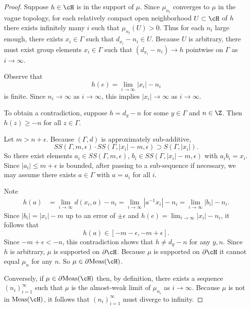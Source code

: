 \documentclass[12pt]{article}
\theoremstyle{plain}
\theoremstyle{definition}
\theoremstyle{remark}
\newcommand{\G}{\Gamma}
\newcommand{\eps}{\epsilon}
\newcommand\Meas{{\operatorname{Meas}}}
\begin{document}
\begin{proof}
    Suppose $h\in \cH$ is in the support of $\mu$.     Since $\mu_{n_i}$ converges to $\mu$ in the vague topology, for each relatively compact open neighborhood $U \subset \cH$ of $h$ there exists infinitely many $i$ such that $\mu_{n_i}(U)>0$. Thus for each $n_i$ large enough, there exists $x_i \in \G$ such that $d_{x_i} - n_i \in U$. Because $U$ is arbitrary, there must exist group elements $x_i \in \G$ such that $(d_{x_i} - n_i) \longrightarrow h$ pointwise on $\G$ as $i\to\infty$.

  Observe that
$$h(e) = \lim_{i\to\infty}|x_i| - n_i$$
is finite. Since $n_i \to \infty$ as $i\to\infty$, this implies $|x_i|\to \infty$ as $i\to\infty$.   

       To obtain a contradiction, suppose $h=d_y-n$ for some $y\in \G$ and $n\in \Z$. Then $h(z) \ge -n$ for all $z \in \G$.

Let $m>n+\eps$. Because $(\G,d)$ is approximately sub-additive, 
$$SS(\G,m,\eps)\cdot SS(\G,|x_i|-m,\eps)\supset S(\G, |x_i|). $$
So there exist elements $a_i \in SS(\G,m,\eps)$, $b_i \in SS(\G,|x_i|-m,\eps)$ with $a_ib_i = x_i$. Since $|a_i|\le m+\eps$ is bounded, after passing to a sub-sequence if necessary, we may assume there exists $a\in \G$ with $a= a_i$ for all $i$. 

Note
\begin{align*}
    h(a) &= \lim_{i\to\infty} d(x_i,a) - n_i =  \lim_{i\to\infty} |a^{-1}x_i| - n_i  = \lim_{i\to\infty} |b_i| - n_i.
\end{align*}
Since $|b_i| = |x_i|-m$ up to an error of $\pm \eps$ and $h(e)=\lim_{i\to\infty} |x_i| - n_i$, it follows that
$$h(a) \in [-m-\eps, -m+\eps].$$
Since $-m+\eps < -n$, this contradiction shows that $h\ne d_y -n$ for any $y,n$. Since $h$ is arbitrary,  $\mu$ is supported on $\partial \cH$. Because $\mu$ is supported on $\partial \cH$ it cannot equal $\mu_n$ for any $n$. So $\mu \in \partial \Meas(\cH)$.

Conversely, if $\mu \in \partial \Meas(\cH)$ then, by definition, there exists a sequence $(n_i)_{i=1}^\infty$ such that $\mu$ is the almost-weak limit of $\mu_{n_i}$ as $i\to\infty$. Because $\mu$ is not in $\Meas(\cH)$, it follows that $(n_i)_{i=1}^\infty$ must diverge to infinity. 
\end{proof} 
    
\end{document}
